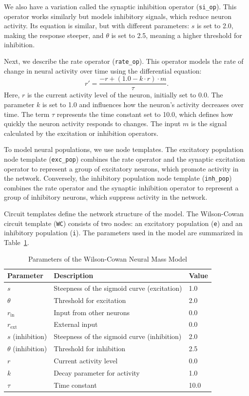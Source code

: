 \documentclass[12pt]{article}
\begin{document}
We also have a variation called the synaptic inhibition operator (\texttt{si\_op}). This operator works similarly but models inhibitory signals, which reduce neuron activity. Its equation is similar, but with different parameters: \( s \) is set to 2.0, making the response steeper, and \( \theta \) is set to 2.5, meaning a higher threshold for inhibition.

Next, we describe the rate operator (\texttt{rate\_op}). This operator models the rate of change in neural activity over time using the differential equation:
\[
r' = \frac{-r + (1.0 - k \cdot r) \cdot m}{\tau}.
\]
Here, \( r \) is the current activity level of the neuron, initially set to 0.0. The parameter \( k \) is set to 1.0 and influences how the neuron's activity decreases over time. The term \( \tau \) represents the time constant set to 10.0, which defines how quickly the neuron activity responds to changes. The input \( m \) is the signal calculated by the excitation or inhibition operators.

To model neural populations, we use node templates. The excitatory population node template (\texttt{exc\_pop}) combines the rate operator and the synaptic excitation operator to represent a group of excitatory neurons, which promote activity in the network. Conversely, the inhibitory population node template (\texttt{inh\_pop}) combines the rate operator and the synaptic inhibition operator to represent a group of inhibitory neurons, which suppress activity in the network.

Circuit templates define the network structure of the model. The Wilson-Cowan circuit template (\texttt{WC}) consists of two nodes: an excitatory population (\texttt{e}) and an inhibitory population (\texttt{i}). The parameters used in the model are summarized in Table~\ref{tab:parameters}.

\begin{table}[h]
    \centering
    \caption{Parameters of the Wilson-Cowan Neural Mass Model}
    \label{tab:parameters}
    \begin{tabular}{@{}lll@{}}
        \toprule
        \textbf{Parameter} & \textbf{Description} & \textbf{Value} \\ \midrule
        \( s \) & Steepness of the sigmoid curve (excitation) & 1.0 \\
        \( \theta \) & Threshold for excitation & 2.0 \\
        \( r_{\mathrm{in}} \) & Input from other neurons & 0.0 \\
        \( r_{\mathrm{ext}} \) & External input & 0.0 \\
        \( s \) (inhibition) & Steepness of the sigmoid curve (inhibition) & 2.0 \\
        \( \theta \) (inhibition) & Threshold for inhibition & 2.5 \\
        \( r \) & Current activity level & 0.0 \\
        \( k \) & Decay parameter for activity & 1.0 \\
        \( \tau \) & Time constant & 10.0 \\ \bottomrule
    \end{tabular}
\end{table}
\end{document}

